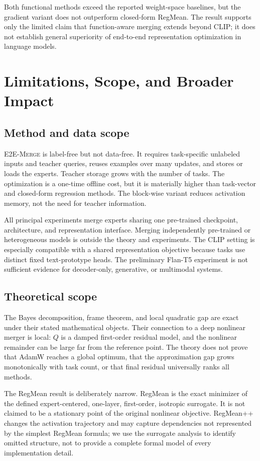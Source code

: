 \documentclass[letterpaper]{article} %
\newcommand{\method}{\textup{\textsc{E2E-Merge}}\xspace}
\theoremstyle{plain}
\theoremstyle{definition}
\begin{document}
Both functional methods exceed the reported weight-space baselines, but the gradient
variant does not outperform closed-form RegMean. The result supports only the limited
claim that function-aware merging extends beyond CLIP; it does not establish general
superiority of end-to-end representation optimization in language models.
\section{Limitations, Scope, and Broader Impact}
\label{app:limitations}

\subsection{Method and data scope}
\method is label-free but not data-free. It requires task-specific unlabeled inputs and
teacher queries, reuses examples over many updates, and stores or loads the experts.
Teacher storage grows with the number of tasks. The optimization is a one-time offline
cost, but it is materially higher than task-vector and closed-form regression methods.
The block-wise variant reduces activation memory, not the need for teacher information.

All principal experiments merge experts sharing one pre-trained checkpoint, architecture,
and representation interface. Merging independently pre-trained or heterogeneous models
is outside the theory and experiments. The CLIP setting is especially compatible with a
shared representation objective because tasks use distinct fixed text-prototype heads.
The preliminary Flan-T5 experiment is not sufficient evidence for decoder-only,
generative, or multimodal systems.

\subsection{Theoretical scope}
The Bayes decomposition, frame theorem, and local quadratic gap are exact under their
stated mathematical objects. Their connection to a deep nonlinear merger is local:
$Q$ is a damped first-order residual model, and the nonlinear remainder can be large far
from the reference point. The theory does not prove that AdamW reaches a global optimum,
that the approximation gap grows monotonically with task count, or that final residual
universally ranks all methods.

The RegMean result is deliberately narrow. RegMean is the exact minimizer of the defined
expert-centered, one-layer, first-order, isotropic surrogate. It is not claimed to be a
stationary point of the original nonlinear objective. RegMean++ changes the activation
trajectory and may capture dependencies not represented by the simplest RegMean formula;
we use the surrogate analysis to identify omitted structure, not to provide a complete
formal model of every implementation detail.
\end{document}

